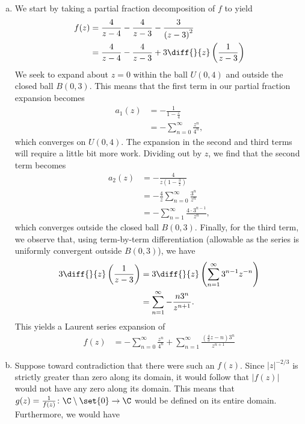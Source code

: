 \documentclass[11pt]{mypackage}
\begin{document}
\begin{solution}\hfill
  \begin{enumerate}[(a)]
    \item We start by taking a partial fraction decomposition of $f$ to yield
      \begin{align*}
        f(z) &= \frac{4}{z-4} - \frac{4}{z-3} -\frac{3}{\left( z-3 \right)^2}\\
             &= \frac{4}{z-4} - \frac{4}{z-3} + 3 \diff{}{z}\left( \frac{1}{z-3} \right) 
      \end{align*}
      We seek to expand about $z = 0$ within the ball $U\left( 0,4 \right)$ and outside the closed ball $B\left( 0,3 \right)$. This means that the first term in our partial fraction expansion becomes
      \begin{align*}
        a_1(z) &= -\frac{1}{1-\frac{z}{4}}\\
               &= -\sum_{n=0}^{\infty} \frac{z^{n}}{4^{n}},
      \end{align*}
      which converges on $U\left( 0,4 \right)$. The expansion in the second and third terms will require a little bit more work. Dividing out by $z$, we find that the second term becomes
      \begin{align*}
        a_2(z) &= -\frac{4}{z\left( 1-\frac{3}{z} \right)}\\
               &= -\frac{4}{z} \sum_{n=0}^{\infty} \frac{3^{n}}{z^{n}}\\
               &= -\sum_{n=1}^{\infty}\frac{4\cdot 3^{n-1}}{z^{n}},
      \end{align*}
      which converges outside the closed ball $B\left( 0,3 \right)$. Finally, for the third term, we observe that, using term-by-term differentiation (allowable as the series is uniformly convergent outside $B\left( 0,3 \right)$), we have
      \begin{align*}
        3\diff{}{z}\left( \frac{1}{z-3} \right) &= 3\diff{}{z}\left( \sum_{n=1}^{\infty} 3^{n-1}z^{-n} \right)\\
                                                &= \sum_{n=1}^{\infty} -\frac{n3^{n}}{z^{n+1}}.
      \end{align*}
      This yields a Laurent series expansion of
      \begin{align*}
        f(z) &= -\sum_{n=0}^{\infty} \frac{z^{n}}{4^{n}} + \sum_{n=1}^{\infty} \frac{\left( \frac{4}{3} z - n \right)3^{n}}{z^{n+1}}
      \end{align*}
    \item Suppose toward contradiction that there were such an $f(z)$. Since $\left\vert z \right\vert^{-2/3}$ is strictly greater than zero along its domain, it would follow that $\left\vert f(z) \right\vert$ would not have any zero along its domain. This means that $ g(z) = \frac{1}{f(z)}\colon\C\setminus \set{0}\rightarrow\C $ would be defined on its entire domain. Furthermore, we would have

\end{enumerate}
\end{solution}
\end{document}
